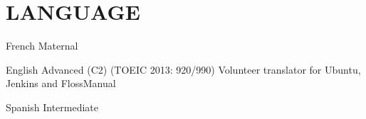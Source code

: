 \documentclass[11pt,a4paper]{moderncv}
\begin{document}







  \section{LANGUAGE}\label{sec:language}

  \cvlanguage
    {French}
    {Maternal}{}{}{}{}

  \cvlanguage
    {English}
    {Advanced (C2) (TOEIC 2013: 920/990)}
    {Volunteer translator for Ubuntu, Jenkins and FlossManual}

  \cvlanguage
    {Spanish}
    {Intermediate}
    {}{}{}{}

%
%
%
\end{document}
